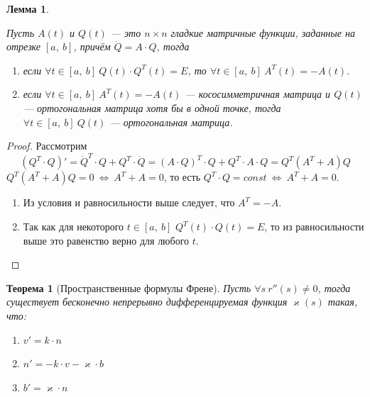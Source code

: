 \documentclass[12pt]{article}
\theoremstyle{plain}
\newtheorem{theorem}{Теорема}[section]
\newtheorem{lemma}{Лемма}[section]
\begin{document}
    \begin{lemma}\hypertarget{3}{}
        Пусть $A(t)$ и $Q(t)$ --- это $n\times n$ гладкие матричные функции, заданные на отрезке $[a, \ b]$, причём $\dot{Q}=A\cdot Q$, тогда
        \begin{enumerate}
            \item если $\forall t\in[a, \ b] \ Q(t)\cdot Q^T(t)=E$, то $\forall t\in[a, \ b] \ A^T(t)=-A(t)$.
            \item если $\forall t\in[a, \ b] \ A^T(t)=-A(t)$ --- кососимметричная матрица и $Q(t)$ --- ортогональная матрица хотя бы в одной точке, тогда $\forall t\in[a, \ b] \ Q(t)$ --- ортогональная матрица.
        \end{enumerate}
    \end{lemma}
    \begin{proof}
        Рассмотрим $$(Q^T\cdot Q)'=\dot{Q}^T\cdot Q+Q^T\cdot\dot{Q}=(A\cdot Q)^T\cdot Q+Q^T\cdot A\cdot Q=Q^T(A^T+A)Q$$ $Q^T(A^T+A)Q=0 \ \Longleftrightarrow \ A^T+A=0$, то есть $Q^T\cdot Q=const \ \Longleftrightarrow \ A^T+A=0$.
        \begin{enumerate}
            \item Из условия и равносильности выше следует, что $A^T=-A$.
            \item Так как для некоторого $t\in[a, \ b]$ $Q^T(t)\cdot Q(t)=E$, то из равносильности выше это равенство верно для любого $t$.
        \end{enumerate}
    \end{proof}
    \begin{theorem}[\hypertarget{4}{Пространственные формулы Френе}]
        Пусть $\forall s \ r''(s)\neq0$, тогда существует бесконечно непрерывно дифференцируемая функция $\varkappa(s)$ такая, что:
        \begin{enumerate}
            \item $v'=k\cdot n$
            \item $n'=-k\cdot v-\varkappa\cdot b$
            \item $b'=\varkappa\cdot n$
        \end{enumerate}
    \end{theorem}
\end{document}
